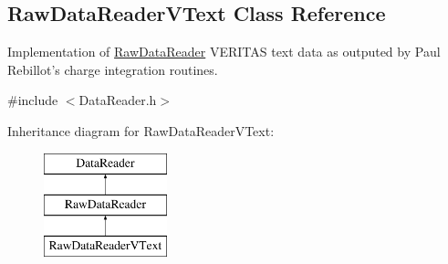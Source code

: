 \hypertarget{classRawDataReaderVText}{
\subsection{RawDataReaderVText Class Reference}
\label{classRawDataReaderVText}
}


Implementation of \hyperlink{classRawDataReader}{RawDataReader} VERITAS text data as outputed by Paul Rebillot's charge integration routines.  




{\ttfamily \#include $<$DataReader.h$>$}

Inheritance diagram for RawDataReaderVText:\begin{figure}[H]
\begin{center}
\leavevmode
\includegraphics[height=3.000000cm]{classRawDataReaderVText}
\end{center}
\end{figure}
